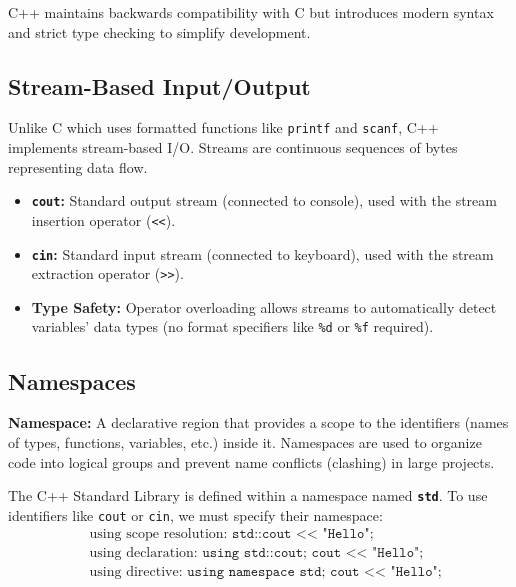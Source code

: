 \documentclass[12pt,a4paper]{article}
\begin{document}
C++ maintains backwards compatibility with C but introduces modern syntax and strict type checking to simplify development.

\subsection{Stream-Based Input/Output}
Unlike C which uses formatted functions like \texttt{printf} and \texttt{scanf}, C++ implements stream-based I/O. Streams are continuous sequences of bytes representing data flow.
\begin{itemize}[leftmargin=*, itemsep=3pt]
  \item \textbf{\texttt{cout}:} Standard output stream (connected to console), used with the stream insertion operator (\texttt{<<}).
  \item \textbf{\texttt{cin}:} Standard input stream (connected to keyboard), used with the stream extraction operator (\texttt{>>}).
  \item \textbf{Type Safety:} Operator overloading allows streams to automatically detect variables' data types (no format specifiers like \texttt{\%d} or \texttt{\%f} required).
\end{itemize}

\subsection{Namespaces}
\begin{tcolorbox}[defbox]
\textbf{Namespace:} A declarative region that provides a scope to the identifiers (names of types, functions, variables, etc.) inside it. Namespaces are used to organize code into logical groups and prevent name conflicts (clashing) in large projects.
\end{tcolorbox}
The C++ Standard Library is defined within a namespace named \textbf{\texttt{std}}. To use identifiers like \texttt{cout} or \texttt{cin}, we must specify their namespace:
\begin{align}
  &\text{using scope resolution: } \texttt{std::cout << "Hello";}\\
  &\text{using declaration: } \texttt{using std::cout; cout << "Hello";}\\
  &\text{using directive: } \texttt{using namespace std; cout << "Hello";}
\end{align}
\end{document}
